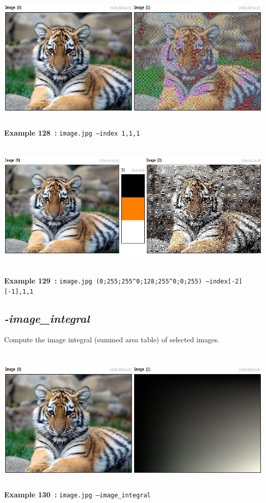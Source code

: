 \documentclass[a4paper,11pt,twoside]{book}
\begin{document}
\begin{center}\includegraphics[keepaspectratio=true,height=7cm,width=\textwidth]{img/gmic_def128.jpg}\\
{\footnotesize \textbf{Example 128~:} \texttt{image.jpg --index 1,1,1}}
\\\includegraphics[keepaspectratio=true,height=7cm,width=\textwidth]{img/gmic_def129.jpg}\\
{\footnotesize \textbf{Example 129~:} \texttt{image.jpg (0;255;255\textasciicircum 0;128;255\textasciicircum 0;0;255) --index[-2] [-1],1,1}}
\end{center}

\subsection{\emph{-image\_integral} }\vspace*{-0.5em}
Compute the image integral (summed area table) of selected images.
\begin{center}\includegraphics[keepaspectratio=true,height=7cm,width=\textwidth]{img/gmic_def130.jpg}\\
{\footnotesize \textbf{Example 130~:} \texttt{image.jpg --image\_integral}}
\end{center}
\end{document}
